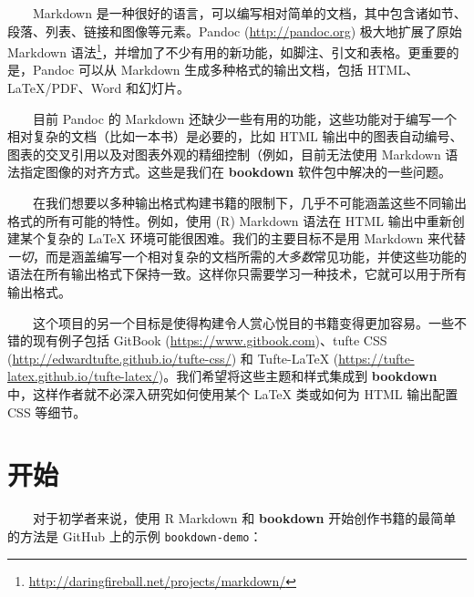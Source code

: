 \documentclass[
  12pt,
]{krantz}
\renewcommand{\href}[2]{#2\footnote{\url{#1}}}
\theoremstyle{definition}
\theoremstyle{definition}
\theoremstyle{definition}
\theoremstyle{definition}
\theoremstyle{remark}
\begin{document}
  Markdown 是一种很好的语言，可以编写相对简单的文档，其中包含诸如节、段落、列表、链接和图像等元素。Pandoc (\url{http://pandoc.org}) 极大地扩展了\href{http://daringfireball.net/projects/markdown/}{原始 Markdown 语法}，并增加了不少有用的新功能，如脚注、引文和表格。更重要的是，Pandoc 可以从 Markdown 生成多种格式的输出文档，包括 HTML、LaTeX/PDF、Word 和幻灯片。

  目前 Pandoc 的 Markdown 还缺少一些有用的功能，这些功能对于编写一个相对复杂的文档（比如一本书）是必要的，比如 HTML 输出中的图表自动编号、图表的交叉引用以及对图表外观的精细控制（例如，目前无法使用 Markdown 语法指定图像的对齐方式。这些是我们在 \textbf{bookdown} 软件包中解决的一些问题。

  在我们想要以多种输出格式构建书籍的限制下，几乎不可能涵盖这些不同输出格式的所有可能的特性。例如，使用 (R) Markdown 语法在 HTML 输出中重新创建某个复杂的 LaTeX 环境可能很困难。我们的主要目标不是用 Markdown 来代替\emph{一切}，而是涵盖编写一个相对复杂的文档所需的\emph{大多数}常见功能，并使这些功能的语法在所有输出格式下保持一致。这样你只需要学习一种技术，它就可以用于所有输出格式。

  这个项目的另一个目标是使得构建令人赏心悦目的书籍变得更加容易。一些不错的现有例子包括 GitBook (\url{https://www.gitbook.com})、tufte CSS (\url{http://edwardtufte.github.io/tufte-css/}) 和 Tufte-LaTeX (\url{https://tufte-latex.github.io/tufte-latex/})。我们希望将这些主题和样式集成到 \textbf{bookdown} 中，这样作者就不必深入研究如何使用某个 LaTeX 类或如何为 HTML 输出配置 CSS 等细节。

\hypertarget{ux5f00ux59cb}{%
\section{开始}\label{ux5f00ux59cb}}

  对于初学者来说，使用 R Markdown 和 \textbf{bookdown} 开始创作书籍的最简单的方法是 GitHub 上的示例 \texttt{bookdown-demo}：
\end{document}
